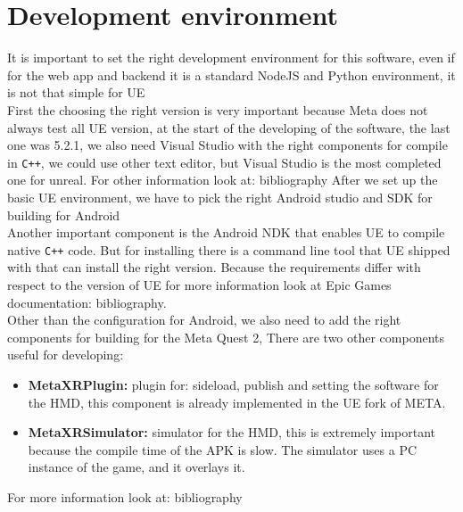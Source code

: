 \section{Development environment}
\noindent
It is important to set the right development environment for this software, even if for the web app and backend it is a standard NodeJS and Python environment, 
it is not that simple for \ac{UE}\\
First the choosing the right version is very important because Meta does not always test all \ac{UE} version, at the start of the developing of the software, the last one was 5.2.1,
we also need Visual Studio with the right components for compile in \texttt{C++}, we could use other text editor, but Visual Studio is the most completed one for unreal.
For other information look at: bibliography\cite{UEvisualStudio}
After we set up the basic \ac{UE} environment, we have to pick the right Android studio and \ac{SDK} for building for Android \\
Another important component is the Android \ac{NDK} that enables \ac{UE} to compile native \texttt{C++} code.
But for installing there is a command line tool that \ac{UE} shipped with that can install the right version. 
Because the requirements differ with respect to the version of \ac{UE} for more information look at Epic Games documentation: bibliography\cite{UEandroid}.\\
Other than the configuration for Android, we also need to add the right components for building for the Meta Quest 2,
There are two other components useful for developing:
\begin{itemize}
  \item \textbf{MetaXRPlugin:} plugin for: sideload, publish and setting the software for the \ac{HMD}, this component is already implemented in the \ac{UE} fork of META.
  \item \textbf{MetaXRSimulator:} simulator for the \ac{HMD}, this is extremely important because the compile time of the \ac{APK} is slow. The simulator uses a PC instance of the game, and it overlays it.
\end{itemize}
\noindent
For more information look at: bibliography\cite{MetaSetup}

